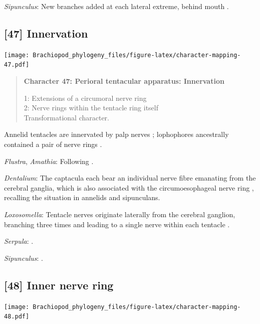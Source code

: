 \documentclass[openany]{book}
\begin{document}
\hypertarget{Sipunculus-coding-46}{}
\emph{Sipunculus}: New branches added at each lateral extreme, behind
mouth \citep{Adrianov2006}.

\subsection*{{[}47{]} Innervation}\label{innervation}

\texttt{[image: Brachiopod\_phylogeny\_files/figure-latex/character-mapping-47.pdf]}

\begin{quote}
\textbf{Character 47: Perioral tentacular apparatus: Innervation}

1: Extensions of a circumoral nerve ring\\
2: Nerve rings within the tentacle ring itself\\
Transformational character.
\end{quote}

Annelid tentacles are innervated by palp nerves \citep{Orrhage2005};
lophophores ancestrally contained a pair of nerve rings
\citep{Temereva2017Innervationof}.

\hypertarget{Amathia-coding-47}{}
\emph{Flustra}, \emph{Amathia}: Following
\citet{Temereva2017Innervationof}.

\hypertarget{Dentalium-coding-47}{}
\emph{Dentalium}: The captacula each bear an individual nerve fibre
emanating from the cerebral ganglia, which is also associated with the
circumoesophageal nerve ring \citep{SumnerRooney2015}, recalling the
situation in annelids and sipunculans.

\hypertarget{Loxosomella-coding-47}{}
\emph{Loxosomella}: Tentacle nerves originate laterally from the
cerebral ganglion, branching three times and leading to a single nerve
within each tentacle \citep{Fuchs2006}.

\hypertarget{Serpula-coding-47}{}
\emph{Serpula}: \citet{Orrhage2005}.

\hypertarget{Sipunculus-coding-47}{}
\emph{Sipunculus}: \citet{Rice1993}.

\subsection*{{[}48{]} Inner nerve ring}\label{inner-nerve-ring}

\texttt{[image: Brachiopod\_phylogeny\_files/figure-latex/character-mapping-48.pdf]}
\end{document}
